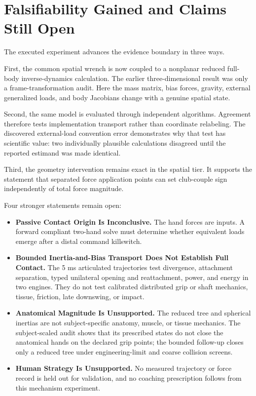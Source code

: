 \documentclass[
  letterpaper,
]{report}
\providecommand{\tightlist}{%
  \setlength{\itemsep}{0pt}\setlength{\parskip}{0pt}}
\begin{document}
\section{Falsifiability Gained and Claims Still
Open}\label{sec-spatial-claim-boundary}

The executed experiment advances the evidence boundary in three ways.

First, the common spatial wrench is now coupled to a nonplanar reduced
full-body inverse-dynamics calculation. The earlier three-dimensional
result was only a frame-transformation audit. Here the mass matrix, bias
forces, gravity, external generalized loads, and body Jacobians change
with a genuine spatial state.

Second, the same model is evaluated through independent algorithms.
Agreement therefore tests implementation transport rather than
coordinate relabeling. The discovered external-load convention error
demonstrates why that test has scientific value: two individually
plausible calculations disagreed until the reported estimand was made
identical.

Third, the geometry intervention remains exact in the spatial tier. It
supports the statement that separated force application points can set
club-couple sign independently of total force magnitude.

Four stronger statements remain open:

\begin{itemize}
\tightlist
\item
  \textbf{Passive Contact Origin Is Inconclusive.} The hand forces are
  inputs. A forward compliant two-hand solve must determine whether
  equivalent loads emerge after a distal command killswitch.
\item
  \textbf{Bounded Inertia-and-Bias Transport Does Not Establish Full
  Contact.} The 5 ms articulated trajectories test divergence,
  attachment separation, typed unilateral opening and reattachment,
  power, and energy in two engines. They do not test calibrated
  distributed grip or shaft mechanics, tissue, friction, late downswing,
  or impact.
\item
  \textbf{Anatomical Magnitude Is Unsupported.} The reduced tree and
  spherical inertias are not subject-specific anatomy, muscle, or tissue
  mechanics. The subject-scaled audit shows that its prescribed states
  do not close the anatomical hands on the declared grip points; the
  bounded follow-up closes only a reduced tree under engineering-limit
  and coarse collision screens.
\item
  \textbf{Human Strategy Is Unsupported.} No measured trajectory or
  force record is held out for validation, and no coaching prescription
  follows from this mechanism experiment.
\end{itemize}
\end{document}

